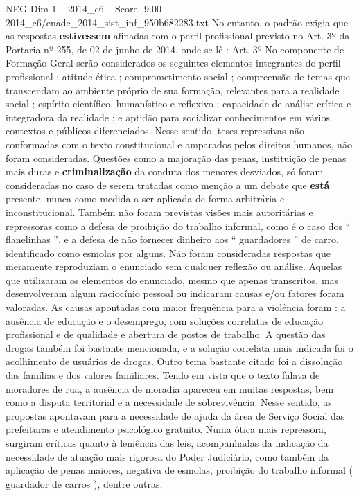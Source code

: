 \begin{textsample}{NEG Dim 1 – 2014\_c6 – Score -9.00 – 2014\_c6/enade\_2014\_sist\_inf\_950b682283.txt}
No entanto, o padrão exigia que as respostas \textbf{estivessem} afinadas com o perfil profissional previsto no Art. 3º da Portaria nº 255, de 02 de junho de 2014, onde se lê : Art. 3º No componente de Formação Geral serão considerados os seguintes elementos integrantes do perfil profissional : atitude ética ; comprometimento social ; compreensão de temas que transcendam ao ambiente próprio de sua formação, relevantes para a realidade social ; espírito científico, humanístico e reflexivo ; capacidade de análise crítica e integradora da realidade ; e aptidão para socializar conhecimentos em vários contextos e públicos diferenciados.
Nesse sentido, teses repressivas não conformadas com o texto constitucional e amparados pelos direitos humanos, não foram consideradas.
Questões como a majoração das penas, instituição de penas mais duras e \textbf{criminalização} da conduta dos menores desviados, só foram consideradas no caso de serem tratadas como menção a um debate que \textbf{está} presente, nunca como medida a ser aplicada de forma arbitrária e inconstitucional.
Também não foram previstas visões mais autoritárias e repressoras como a defesa de proibição do trabalho informal, como é o caso dos “ flanelinhas ”, e a defesa de não fornecer dinheiro aos “ guardadores ” de carro, identificado como esmolas por alguns.
Não foram consideradas respostas que meramente reproduziam o enunciado sem qualquer reflexão ou análise.
Aquelas que utilizaram os elementos do enunciado, mesmo que apenas transcritos, mas desenvolveram algum raciocínio pessoal ou indicaram causas e/ou fatores foram valoradas.
As causas apontadas com maior frequência para a violência foram : a ausência de educação e o desemprego, com soluções correlatas de educação profissional e de qualidade e abertura de postos de trabalho.
A questão das drogas também foi bastante mencionada, e a solução correlata mais indicada foi o acolhimento de usuários de drogas.
Outro tema bastante citado foi a dissolução das famílias e dos valores familiares.
Tendo em vista que o texto falava de moradores de rua, a ausência de moradia apareceu em muitas respostas, bem como a disputa territorial e a necessidade de sobrevivência.
Nesse sentido, as propostas apontavam para a necessidade de ajuda da área de Serviço Social das prefeituras e atendimento psicológico gratuito.
Numa ótica mais repressora, surgiram críticas quanto à leniência das leis, acompanhadas da indicação da necessidade de atuação mais rigorosa do Poder Judiciário, como também da aplicação de penas maiores, negativa de esmolas, proibição do trabalho informal ( guardador de carros ), dentre outras.

\end{textsample}
